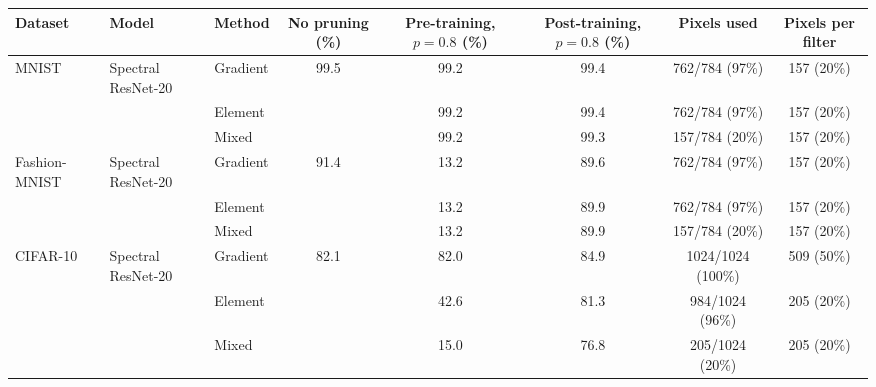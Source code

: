 \begin{tabular}{lllccccc}
\toprule
Dataset & Model & Method & No pruning (\%) & Pre-training, $p=0.8$ (\%) & Post-training, $p=0.8$ (\%) & Pixels used & Pixels per filter \\
\midrule
MNIST & Spectral ResNet-20 & Gradient & 99.5 & 99.2 & 99.4 & 762/784 (97\%) & 157 (20\%) \\
 &  & Element &  & 99.2 & 99.4 & 762/784 (97\%) & 157 (20\%) \\
 &  & Mixed &  & 99.2 & 99.3 & 157/784 (20\%) & 157 (20\%) \\
\midrule
Fashion-MNIST & Spectral ResNet-20 & Gradient & 91.4 & 13.2 & 89.6 & 762/784 (97\%) & 157 (20\%) \\
 &  & Element &  & 13.2 & 89.9 & 762/784 (97\%) & 157 (20\%) \\
 &  & Mixed &  & 13.2 & 89.9 & 157/784 (20\%) & 157 (20\%) \\
\midrule
CIFAR-10 & Spectral ResNet-20 & Gradient & 82.1 & 82.0 & 84.9 & 1024/1024 (100\%) & 509 (50\%) \\
 &  & Element &  & 42.6 & 81.3 & 984/1024 (96\%) & 205 (20\%) \\
 &  & Mixed &  & 15.0 & 76.8 & 205/1024 (20\%) & 205 (20\%) \\
\bottomrule
\end{tabular}
